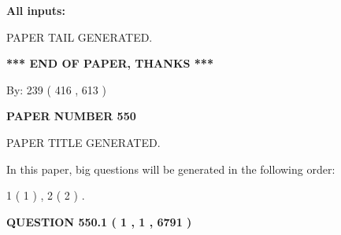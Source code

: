 \documentclass{ctexart}
\begin{document}
   
   
   
\noindent{}
   
   
   
   
\noindent\vspace{0.1in}\hspace{-0.08in} {\textbf{\Large{All inputs: }}}
   
   
   
   
   
   
 \vspace{0.2in}
 
   
   
\vspace{2.0in} PAPER TAIL GENERATED.
   
   
   
   
\vspace{1.0in} 
{\textbf{\large{ *** END OF PAPER, THANKS *** }}} 
   
   
\hspace{1.0in} By: 
 239 ( 416 ,  613 )
   
   
   
   
\newpage 
\setcounter{page}{ 
   550001 } 
   
   
   
   
 {\textbf{ \Large{ PAPER NUMBER  550  }}}
   
   
\vspace{0.2in}
   
   
   
   
   
   
   
   
 \vspace{0.2in}
 
 
 
 
   
   
 PAPER TITLE GENERATED.
   
   
   
\vspace{0.2in}
   
In this paper, big questions will be generated in the following order: 
   
   
   1 ( 1 )
 ,
   2 ( 2 )
 .
  
\vspace{0.2in}
  
{\textbf{\Large{QUESTION
550.1 
 ( 1 , 1 , 6791 )
}}}
  
\end{document}
